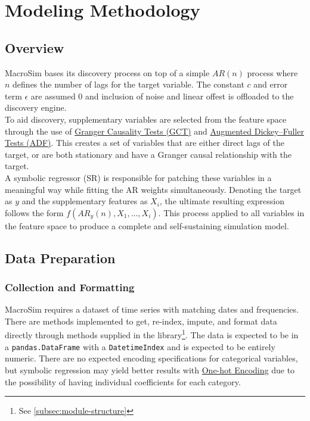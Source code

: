 
\section{Modeling Methodology}\label{sec:modeling-methodology}
\subsection{Overview}\label{subsec:overview}
    MacroSim bases its discovery process on top of a simple $AR(n)$ process where $n$ defines the number of lags for the target variable.
    The constant $c$ and error term $\epsilon$ are assumed 0 and inclusion of noise and linear offest is offloaded to the discovery engine.
    \\

    To aid discovery, supplementary variables are selected from the feature space through the use of \href{https://en.wikipedia.org/wiki/Granger_causality}{ Granger Causality Tests (GCT)} and \href{https://en.wikipedia.org/wiki/Augmented_Dickey%E2%80%93Fuller_test}{Augmented Dickey–Fuller Tests (ADF)}.
    This creates a set of variables that are either direct lags of the target, or are both stationary and have a Granger causal relationship with the target.
    \\

    A symbolic regressor (SR) is responsible for patching these variables in a meaningful way while fitting the AR weights simultaneously.
    Denoting the target as $y$ and the supplementary features as $X_i$, the ultimate resulting expression follows the form $f(AR_y(n), X_1, \dots, X_i)$.
    This process applied to all variables in the feature space to produce a complete and self-sustaining simulation model.

\subsection{Data Preparation}\label{subsec:data-preparation}
\subsubsection{Collection and Formatting}
    MacroSim requires a dataset of time series with matching dates and frequencies.
    There are methods implemented to get, re-index, impute, and format data directly through methods supplied in the library\footnote[1]{See \autoref{subsec:module-structure}\label{fn1}}.
    The data is expected to be in a \texttt{pandas.DataFrame} with a \texttt{DatetimeIndex} and is expected to be entirely numeric.
    There are no expected encoding specifications for categorical variables, but symbolic regression may yield better results with \href{https://en.wikipedia.org/wiki/One-hot}{One-hot Encoding} due to the possibility of having individual coefficients for each category.

